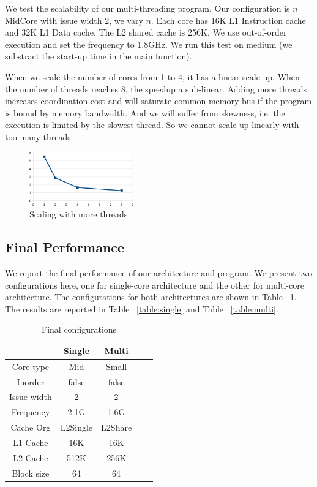 \documentclass[twocolumn,letterpaper,10pt]{article}
\begin{document}
We test the scalability of our multi-threading program. Our configuration is $n$ MidCore with issue width 2, we vary $n$. Each core
has 16K L1 Instruction cache and 32K L1 Data cache. The L2 shared
cache is 256K. We use out-of-order execution and set the frequency to
1.8GHz. We run this test on medium (we substract the start-up time in
the main function).

When we scale the number of cores from 1 to 4, it has a linear
scale-up. When the number of threads reaches 8, the speedup a
sub-linear. Adding more threads increases coordination cost and will
saturate common memory bus if the program is bound by memory bandwidth. And we will suffer from skewness, i.e. the
execution is limited by the slowest thread. So we cannot scale up linearly with too many threads.

\begin{figure}[ht!]
\centering
\includegraphics[width=0.4\textwidth]{figures/scale2.eps}
\caption{Scaling with more threads}
\end{figure}

\subsection{Final Performance}
We report the final performance of our architecture and program. We
present two configurations here, one for single-core architecture and the
other for multi-core architecture. The configurations for both architectures
are shown in Table ~\ref{table:config}. The results are reported in Table ~\ref{table:single} and Table ~\ref{table:multi}.

\begin{table}[ht!]
\begin{center}
\begin{tabular}{ccccc}
\toprule
& Single & Multi \\
\midrule
Core type & Mid & Small \\
Inorder & false & false \\
Issue width & 2 & 2 \\
Frequency & 2.1G & 1.6G \\
Cache Org & L2Single & L2Share \\
L1 Cache & 16K & 16K \\
L2 Cache & 512K & 256K \\
Block size & 64 & 64 \\
\bottomrule
\end{tabular}
\end{center}
\caption{Final configurations}
\label{table:config}
\end{table}
\end{document}
